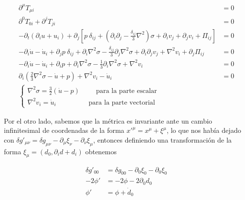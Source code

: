\begin{equation}
    \begin{split}
        \partial^\mu T_{\mu i} &= 0\\
        \partial^0 T_{0i} + \partial^j T_{ji} &= 0\\
        - \partial_t \left( \partial_i u + u_i \right) + \partial_j \left[ p \ \delta_{ij} + \left( \partial_i \partial_j - \frac{\delta_{ij}}{3} \nabla^2 \right) \sigma + \partial_i v_j + \partial_j v_i + \Pi_{ij} \right] &= 0\\
        -\partial_i \dot{u} - \dot{u}_i + \partial_j p \ \delta_{ij} + \partial_i \nabla^2 \sigma - \frac{\delta_{ij}}{3} \partial_j \nabla^2 \sigma + \partial_i \partial_j v_j + \nabla^2 v_i + \partial_j \Pi_{ij} &= 0\\
        -\partial_i \dot{u} - \dot{u}_i + \partial_i p + \partial_i \nabla^2 \sigma - \frac{1}{3} \partial_i \nabla^2 \sigma + \nabla^2 v_i &= 0\\
        \partial_i \left( \frac{2}{3} \nabla^2 \sigma - \dot{u} + p \right) + \nabla^2 v_i - \dot{u}_i &= 0\\
        \begin{cases}
            \displaystyle \nabla^2 \sigma = \frac{3}{2} \left( \dot{u} - p \right) \hspace{1cm} \text{para la parte escalar}\\
            \displaystyle \nabla^2 v_i = \dot{u}_i \hspace{2cm} \text{para la parte vectorial}
        \end{cases}
    \end{split}
\end{equation}

Por el otro lado, sabemos que la métrica es invariante ante un cambio infinitesimal de coordenadas de la forma $x'^\mu = x^\mu + \xi^\mu$, lo que nos había dejado con $\delta g'_{\mu \nu} = \delta g_{\mu\nu} - \partial_\mu \xi_\nu - \partial_\nu \xi_\mu$, entonces definiendo una transformación de la forma $\xi_\mu = \left( d_0, \partial_i d + d_i \right)$ obtenemos

\begin{equation}
    \begin{split}
        \delta g'_{00} &= \delta g_{00} - \partial_0 \xi_0 - \partial_0 \xi_0\\
        - 2 \phi' &= - 2 \phi - 2 \partial_0 d_0\\
        \phi'&= \phi + \dot{d}_0
    \end{split}
\end{equation}

